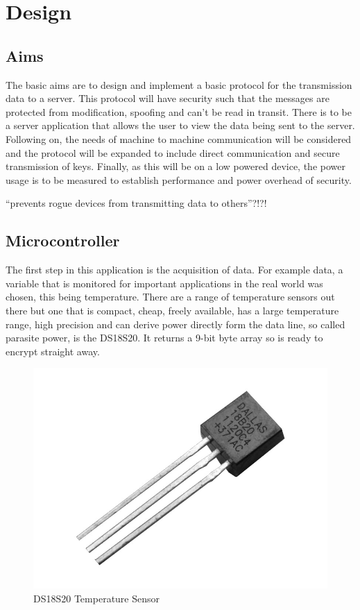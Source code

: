 
\chapter{Design}
\label{design}

\section{Aims}

The basic aims are to design and implement a basic protocol for the transmission data to a server. This protocol will have security such that the messages are protected from modification, spoofing and can't be read in transit. There is to be a server application that allows the user to view the data being sent to the server.
Following on, the needs of machine to machine communication will be considered and the protocol will be expanded to include direct communication and secure transmission of keys. Finally, as this will be on a low powered device, the power usage is to be measured to establish performance and power overhead of security. 

``prevents rogue devices from transmitting data to others''?!?!

\section{Microcontroller}

The first step in this application is the acquisition of data. For example data, a variable that is monitored for important applications in the real world was chosen, this being temperature. There are a range of temperature sensors out there but one that is compact, cheap, freely available, has a large temperature range, high precision and can derive power directly form the data line, so called parasite power, is the DS18S20. It returns a 9-bit byte array so is ready to encrypt straight away. 

\begin{figure}[h]
	\centering
	\includegraphics[width=.4\linewidth]{Figures/ds.jpg}
	\caption{DS18S20 Temperature Sensor}
	\label{fig:ds}
\end{figure}

